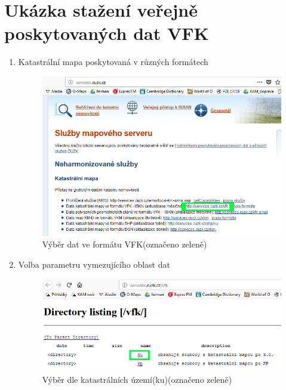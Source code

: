  \section{Ukázka stažení veřejně poskytovaných dat VFK}
 \label{sec:stazeni_dat_ukazka}
  \begin{enumerate}
  \item{Katastrální mapa poskytovaná v různých formátech}
  \begin{figure}[H]
	 \centering
      \includegraphics[width=15cm]{./pictures/stazeni_dat_1kr.png}
      \caption{Výběr dat ve formátu VFK(označeno zeleně)}
      \label{fig:1kr_stazeni}
  \end{figure}
  
  \item{Volba parametru vymezujícího oblast dat}
  \begin{figure}[H]
	 \centering
      \includegraphics[width=15cm]{./pictures/stazeni_dat_2kr.png}
      \caption{Výběr dle katastrálních území(ku)(označeno zeleně)}
      \label{fig:2kr_stazeni}
  \end{figure}
  

\end{enumerate}
